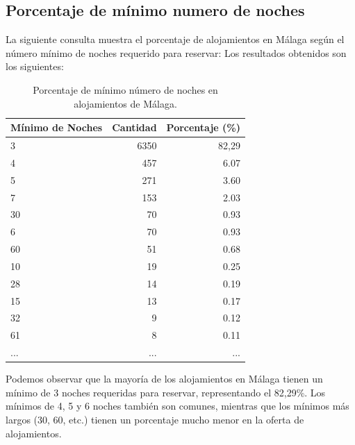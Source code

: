 \subsection{Porcentaje de mínimo numero de noches}
La siguiente consulta muestra el porcentaje de alojamientos en Málaga según el número mínimo de noches requerido para reservar:
Los resultados obtenidos son los siguientes:

\begin{table}[h]
\centering
\begin{tabular}{|l|r|r|}
\hline
\textbf{Mínimo de Noches} & \textbf{Cantidad} & \textbf{Porcentaje (\%)} \\ \hline
3 & 6350 & 82,29 \\ \hline
4 & 457 & 6.07 \\ \hline
5 & 271 & 3.60 \\ \hline
7 & 153 & 2.03 \\ \hline
30 & 70 & 0.93 \\ \hline
6 & 70 & 0.93 \\ \hline
60 & 51 & 0.68 \\ \hline
10 & 19 & 0.25 \\ \hline
28 & 14 & 0.19 \\ \hline
15 & 13 & 0.17 \\ \hline
32 & 9 & 0.12 \\ \hline
61 & 8 & 0.11 \\ \hline
... & ... & ... \\ \hline
\end{tabular}
\caption{Porcentaje de mínimo número de noches en alojamientos de Málaga.}
\end{table}

Podemos observar que la mayoría de los alojamientos en Málaga tienen un mínimo de 3 noches requeridas para reservar, representando el 82,29\%. Los mínimos de 4, 5 y 6 noches también son comunes, mientras que los mínimos más largos (30, 60, etc.) tienen un porcentaje mucho menor en la oferta de alojamientos.

